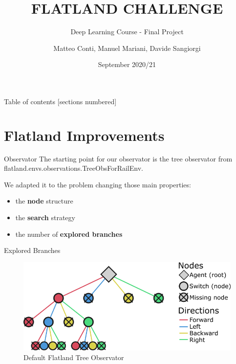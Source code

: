 \documentclass[10pt, xcolor={dvipsnames}]{beamer}
\title{FLATLAND CHALLENGE}
\subtitle{Deep Learning Course - Final Project}
\author{Matteo Conti, Manuel Mariani, Davide Sangiorgi}
\date{September 2020/21}
\institute{M.Sc. Artificial Intelligence, University of Bologna}
\begin{document}
\maketitle

\begin{frame}{Table of contents}
  [sections numbered]
  \tableofcontents%
\end{frame}




\section{Flatland Improvements}
\begin{frame}{Observator}
    The starting point for our observator is the tree observator from flatland.envs.observations.TreeObsForRailEnv.
    
    We adapted it to the problem changing those main properties:
    \begin{itemize}
        \item the \textbf{node} structure
        \item the \textbf{search} strategy
        \item the number of \textbf{explored branches}
    \end{itemize}
\end{frame}
\begin{frame}{Explored Branches}
    \begin{figure}
        \centering
        \includegraphics[height=0.3\textwidth]{assets/environment/treeobs.png}
        \caption*{Default Flatland \alert{Tree Observator}}
    \end{figure}
\end{frame}
\end{document}
